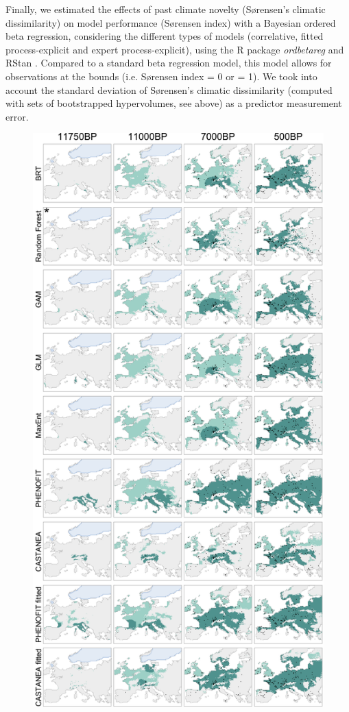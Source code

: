 Finally, we estimated the effects of past climate novelty (Sørensen's climatic dissimilarity) on model performance (Sørensen index) with a Bayesian ordered beta regression, considering the different types of models (correlative, fitted process-explicit and expert process-explicit), using the R package \emph{ordbetareg} \citep{Kubinec2023} and RStan \citep{SDT2023}. Compared to a  standard beta regression model, this model allows for observations at the bounds (i.e. Sørensen index = 0 or = 1). We took into account the standard deviation of Sørensen's climatic dissimilarity (computed with sets of bootstrapped hypervolumes, see above) as a predictor measurement error.

\begin{figure}
\vspace*{-1cm}
\centering
\includegraphics[width=0.7\linewidth]{chapter2/figs/quercus_deciduous_simulations.pdf}

\end{figure}
